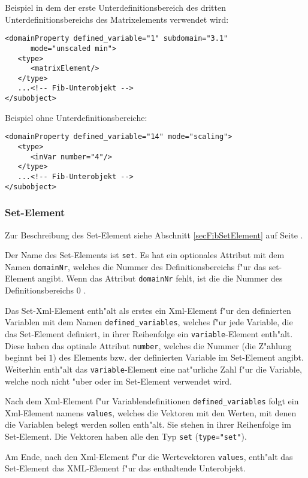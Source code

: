 \noindent
Beispiel in dem der erste Unterdefinitionsbereich des dritten Unterdefinitionsbereichs des Matrixelements verwendet wird:
\begin{verbatim}
<domainProperty defined_variable="1" subdomain="3.1"
      mode="unscaled min">
   <type>
      <matrixElement/>
   </type>
   ...<!-- Fib-Unterobjekt -->
</subobject>
\end{verbatim}

\noindent
Beispiel ohne Unterdefinitionsbereiche:
\begin{verbatim}
<domainProperty defined_variable="14" mode="scaling">
   <type>
      <inVar number="4"/>
   </type>
   ...<!-- Fib-Unterobjekt -->
</subobject>
\end{verbatim}



\subsubsection{Set-Element}

Zur Beschreibung des Set-Element siehe Abschnitt \ref{secFibSetElement} auf Seite \pageref{secFibSetElement} .

Der Name des Set-Elements ist \verb|set|. Es hat ein optionales Attribut mit dem Namen \verb|domainNr|, welches die Nummer des Definitionsbereichs f"ur das set-Element angibt. Wenn das Attribut \verb|domainNr| fehlt, ist die die Nummer des Definitionsbereichs $0$ .

Das Set-Xml-Element enth"alt als erstes ein Xml-Element f"ur den definierten Variablen mit dem Namen \verb|defined_variables|, welches f"ur jede Variable, die das Set-Element definiert, in ihrer Reihenfolge ein \verb|variable|-Element enth"alt.
Diese haben das optinale Attribut \verb|number|, welches die Nummer (die Z"ahlung beginnt bei $1$) des Elements bzw. der definierten Variable im Set-Element angibt. Weiterhin enth"alt das \verb|variable|-Element eine nat"urliche Zahl f"ur die Variable, welche noch nicht "uber oder im Set-Element verwendet wird.

Nach dem Xml-Element f"ur Variablendefinitionen \verb|defined_variables| folgt ein Xml-Element namens \verb|values|, welches die Vektoren mit den Werten, mit denen die Variablen belegt werden sollen enth"alt. Sie stehen in ihrer Reihenfolge im Set-Element. Die Vektoren haben alle den Typ \verb|set| (\verb|type="set"|).

Am Ende, nach den Xml-Element f"ur die Wertevektoren \verb|values|, enth"alt das Set-Element das XML-Element f"ur das enthaltende Unterobjekt.

